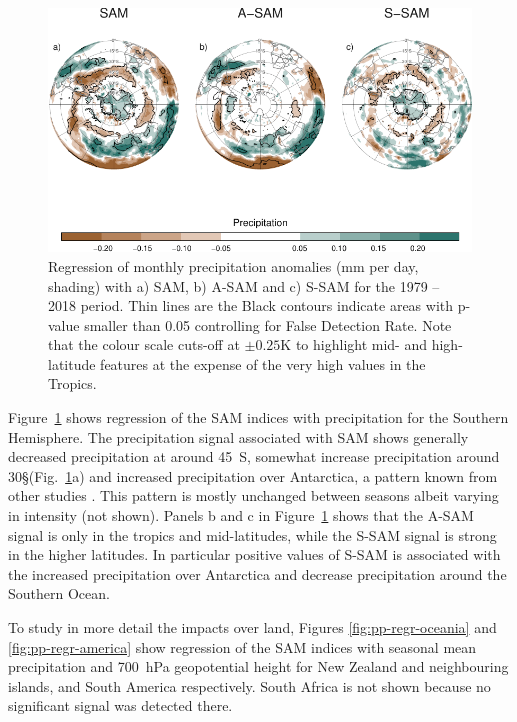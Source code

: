 \documentclass[smallextended]{svjour3}       %
\begin{document}
\begin{figure}
\includegraphics{global-pp-1} \caption{Regression of monthly precipitation anomalies (mm per day, shading) with a) SAM, b) A\nobreakdash-SAM and c) S\nobreakdash-SAM for the 1979 -- 2018 period. Thin lines are the Black contours indicate areas with p-value smaller than 0.05 controlling for False Detection Rate. Note that the colour scale cuts-off at \(\pm0.25 \mathrm{K}\) to highlight mid- and high-latitude features at the expense of the very high values in the Tropics.}\label{fig:global-pp}
\end{figure}

Figure~\ref{fig:global-pp} shows regression of the SAM indices with precipitation for the Southern Hemisphere. The precipitation signal associated with SAM shows generally decreased precipitation at around 45\degree~S, somewhat increase precipitation around 30\degree\S (Fig.~\ref{fig:global-pp}a) and increased precipitation over Antarctica, a pattern known from other studies \citep[e.g.][]{hendon2014}.
This pattern is mostly unchanged between seasons albeit varying in intensity (not shown).
Panels b and c in Figure~\ref{fig:global-pp} shows that the A\nobreakdash-SAM signal is only in the tropics and mid-latitudes, while the S\nobreakdash-SAM signal is strong in the higher latitudes.
In particular positive values of S\nobreakdash-SAM is associated with the increased precipitation over Antarctica and decrease precipitation around the Southern Ocean.

To study in more detail the impacts over land, Figures \ref{fig:pp-regr-oceania} and \ref{fig:pp-regr-america} show regression of the SAM indices with seasonal mean precipitation and 700~hPa geopotential height for New Zealand and neighbouring islands, and South America respectively.
South Africa is not shown because no significant signal was detected there.
\end{document}
